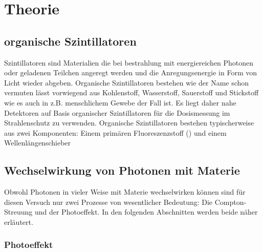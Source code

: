 \section{Theorie}

\subsection{organische Szintillatoren}

Szintillatoren sind  Materialien die bei bestrahlung mit energiereichen Photonen oder geladenen Teilchen angeregt werden und die Anregungsenergie in Form von Licht wieder abgeben. Organische Szintillatoren bestehen wie der Name schon vermuten lässt vorwiegend aus Kohlenstoff, Wasserstoff, Sauerstoff und Stickstoff wie es auch in z.B. menschlichem Gewebe der Fall ist. Es liegt daher nahe Detektoren auf Basis organischer Szintillatoren für die Dosismessung im Strahlenschutz zu verwenden. Organische Szintillatoren bestehen typischerweise aus zwei Komponenten: Einem primären Fluoreszenzstoff () und einem 	\glqq Wellenlängenschieber \grqq{}

\subsection{Wechselwirkung von Photonen mit Materie}

Obwohl Photonen in vieler Weise mit Materie wechselwirken können sind für diesen Versuch nur zwei Prozesse von wesentlicher Bedeutung: Die Compton-Streuung und der Photoeffekt. In den folgenden Abschnitten werden beide näher erläutert.

\subsubsection{Photoeffekt}


